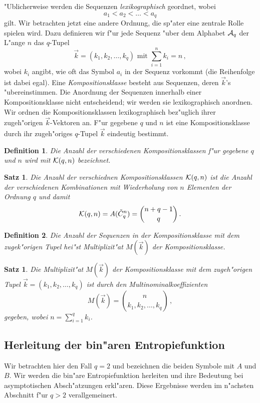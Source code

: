 \documentclass[10pt]{article}
\newtheorem{definition}{Definition}[section]
\newtheorem{satz}[theorem]{Satz}
\begin{document}
"Ublicherweise werden die Sequenzen \emph{lexikographisch} geordnet, wobei
$$ a_1 < a_2 < \ldots < a_q $$
gilt. Wir betrachten  jetzt eine andere Ordnung, die sp"ater eine 
zentrale Rolle spielen wird. Dazu definieren wir f"ur jede Sequenz "uber
dem Alphabet ${\cal A}_q$ der L"ange $n$ das $q$-Tupel
$$ \vec{k}=(k_1, k_2, \ldots, k_q) \mbox{ mit } 
  \sum_{i=1}^n k_i=n \, ,$$
wobei $k_i$ angibt, wie oft das Symbol $a_i$ in der Sequenz vorkommt
(die Reihenfolge ist dabei egal). Eine \emph{Kompositionsklasse} besteht
aus Sequenzen, deren $\vec{k}$'s "ubereinstimmen. Die Anordnung der
Sequenzen innerhalb einer Kompositionsklasse nicht entscheidend; wir werden
sie lexikographisch anordnen. Wir ordnen die Kompositionsklassen 
lexikographisch bez"uglich ihrer zugeh"origen $\vec{k}$-Vektoren an.
F"ur gegebene $q$ und $n$ ist eine Kompositionsklasse durch ihr zugeh"origes
$q$-Tupel $\vec{k}$ eindeutig bestimmt.
%
\begin{definition}
  Die Anzahl der verschiedenen Kompositionsklassen f"ur gegebene $q$ und $n$
  wird mit ${\cal K}(q,n)$ bezeichnet.
\end{definition}
%
\begin{satz}
Die Anzahl der verschiednen Kompositionsklassen ${\cal K}(q,n)$ ist die 
Anzahl der verschiedenen Kombinationen mit Wiederholung von $n$ Elementen der 
Ordnung $q$ und damit 
$$ {\cal K}(q,n)=A(\tilde{C}_q^n) = {n+q-1\choose q} \, . $$
\end{satz}
%
\begin{definition}
Die Anzahl der Sequenzen in der Kompositionsklasse mit dem zugek"origen Tupel
hei"st \emph{Multiplizit"at} $M(\vec{k})$ der Kompositionsklasse.
\end{definition}
%
\begin{satz}
Die Multiplizit"at $M(\vec{k})$ der Kompositionsklasse mit dem zugeh"origen
Tupel $\vec{k}=(k_1,k_2,\ldots,k_q)$ ist durch
den Multinominalkoeffizienten 
$$ M(\vec{k}) = {n \choose k_1, k_2,\ldots, k_q}\,, $$
gegeben, wobei $n=\sum_{i=1}^q k_i$.
\end{satz}


\subsection{Herleitung der bin"aren Entropiefunktion}
Wir betrachten hier den Fall $q=2$ und bezeichnen die beiden Symbole mit
$A$ und $B$. Wir werden die bin"are Entropiefunktion herleiten und ihre 
Bedeutung bei asymptotischen Absch"atzungen erkl"aren. Diese Ergebnisse werden 
im n"achsten Abschnitt f"ur $q>2$ verallgemeinert.
\end{document}
